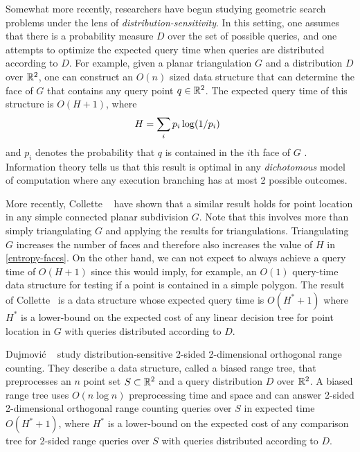 \documentclass{patmorin}
\begin{document}
Somewhat more recently, researchers have begun studying geometric
search problems under the lens of \emph{distribution-sensitivity}. In
this setting, one assumes that there is a probability measure $D$ over
the set of possible queries, and one attempts to optimize the expected
query time when queries are distributed according to $D$.  For example,
given a planar triangulation $G$ and a distribution $D$ over $\mathbb{R}^2$,
one can construct an $O(n)$ sized data structure that can determine
the face of $G$ that contains any query point $q\in\mathbb{R}^2$.  The expected
query time of this structure is $O(H+1)$, where
\begin{equation}
    H = \sum_{i} p_i\log (1/p_i)  \enspace  \eqlabel{entropy-faces}
\end{equation}
and $p_i$ denotes the probability that $q$ is contained in the $i$th face
of $G$ \cite{acmr00,amm00,amm01a,amm01b,ammw07,i01,i04}.  Information
theory tells us that this result is optimal in any \emph{dichotomous}
model of computation where any execution branching has at most 2 possible
outcomes.

More recently, Collette \etal\ \cite{cdilm08,cdilm09} have shown that a
similar result holds for point location in any simple connected planar
subdivision $G$.  Note that this involves more than simply triangulating
$G$ and applying the results for triangulations.  Triangulating $G$
increases the number of faces and therefore also increases the value of
$H$ in \eqref{entropy-faces}.  On the other hand, we can not expect to
always achieve a query time of $O(H+1)$ since this would imply, for
example, an $O(1)$ query-time data structure for testing if a point
is contained in a simple polygon.  The result of Collette \etal\  is
a data structure whose expected query time is $O(H^*+1)$ where $H^*$
is a lower-bound on the expected cost of any linear decision tree for
point location in $G$ with queries distributed according to $D$.

Dujmovi\'c \etal\ \cite{dhm09} study distribution-sensitive 2-sided
2-dimensional orthogonal range counting.  They describe a data
structure, called a biased range tree, that preprocesses an $n$ point
set $S\subset\mathbb{R}^2$ and a query distribution $D$ over $\mathbb{R}^2$.  A biased
range tree uses $O(n\log n)$ preprocessing time and space and can
answer 2-sided 2-dimensional orthogonal range counting queries over
$S$ in expected time $O(H^*+1)$, where $H^*$ is a lower-bound on the
expected cost of any comparison tree for 2-sided range queries over $S$
with queries distributed according to $D$.
\end{document}
